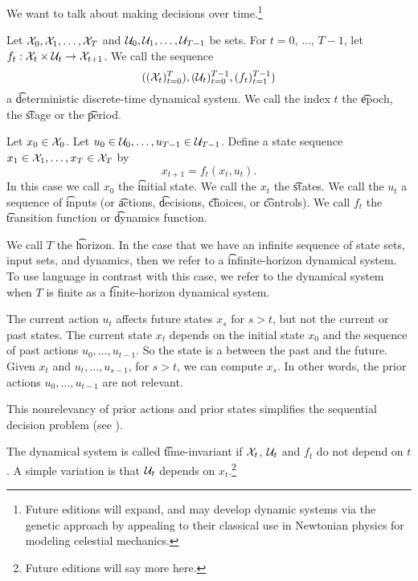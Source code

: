 

We want to talk about making decisions over time.\footnote{Future editions will expand, and may develop dynamic systems via the genetic approach by appealing to their classical use in Newtonian physics for modeling celestial mechanics.}


Let $\mathcal{X}_0, \mathcal{X}_1, \dots, \mathcal{X}_{T}$ and $\mathcal{U}_0, \mathcal{U}_1, \dots, \mathcal{U}_{T-1}$ be sets.
For $t = 0$, $\dots$, $T-1$, let $f_{t}: \mathcal{X}_t \times \mathcal{U}_t \to \mathcal{X}_{t+1}$.
We call the sequence
\[
	((\mathcal{X}_t)_{t = 0}^{T}), (\mathcal{U}_t)_{t=0}^{T-1}, (f_t)_{t=1}^{T-1})
\]
a \t{deterministic discrete-time dynamical system}.
We call the index $t$ the \t{epoch}, the \t{stage} or the \t{period}.

Let $x_0 \in \mathcal{X}_0$.
Let $u_0 \in \mathcal{U}_0, \dots, u_{T-1} \in \mathcal{U}_{T-1}$. Define a state sequence $x_1 \in \mathcal{X}_1, \dots, x_T \in \mathcal{X}_T$ by
\[
    x_{t+1} = f_t(x_t, u_t).
\]
In this case we call $x_0$ the \t{initial state}.
We call the $x_t$ the \t{states}.
We call the $u_t$ a sequence of \t{inputs} (or \t{actions}, \t{decisions}, \t{choices}, or \t{controls}).
We call $f_t$ the \t{transition function} or \t{dynamics function}.

We call $T$ the \t{horizon}.
In the case that we have an infinite sequence of state sets, input sets, and dynamics, then we refer to a \t{infinite-horizon} dynamical system.
To use language in contrast with this case, we refer to the dynamical system when $T$ is finite as a \t{finite-horizon} dynamical system.


The current action $u_t$ affects future states $x_{s}$ for $s > t$, but not the current or past states.
The current state $x_t$ depends on the initial state $x_0$ and the sequence of past actions $u_0, \dots, u_{t-1}$.
So the state is a  between the past and the future.
Given $x_t$ and $u_t, \dots, u_{s-1}$, for $s > t$, we can compute $x_s$.
In other words, the prior actions $u_0, \dots, u_{t-1}$ are not relevant.

This nonrelevancy of prior actions and prior states simplifies the sequential decision problem (see ).


The dynamical system is called \t{time-invariant} if $\mathcal{X}_{t}$, $\mathcal{U}_t$ and $f_t$ do not depend on $t$.
A simple variation is that $\mathcal{U}_t$ depends on $x_t$.\footnote{Future editions will say more here.}

